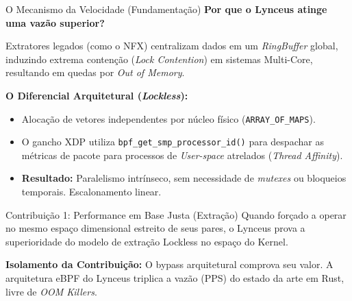 \documentclass[aspectratio=169,11pt]{beamer}
\begin{document}
\begin{frame}{O Mecanismo da Velocidade (Fundamentação)}
    \textbf{Por que o Lynceus atinge uma vazão superior?}
    \vspace{0.3cm}
    
    Extratores legados (como o NFX) centralizam dados em um \textit{RingBuffer} global, induzindo extrema contenção (\textit{Lock Contention}) em sistemas Multi-Core, resultando em quedas por \textit{Out of Memory}.
    
    \vspace{0.3cm}
    \textbf{O Diferencial Arquitetural (\textit{Lockless}):}
    \begin{itemize}
        \item Alocação de vetores independentes por núcleo físico (\texttt{ARRAY\_OF\_MAPS}).
        \item O gancho XDP utiliza \texttt{bpf\_get\_smp\_processor\_id()} para despachar as métricas de pacote para processos de \textit{User-space} atrelados (\textit{Thread Affinity}).
        \item \textbf{Resultado:} Paralelismo intrínseco, sem necessidade de \textit{mutexes} ou bloqueios temporais. Escalonamento linear.
    \end{itemize}
\end{frame}

\begin{frame}{Contribuição 1: Performance em Base Justa (Extração)}
    Quando forçado a operar no mesmo espaço dimensional estreito de seus pares, o Lynceus prova a superioridade do modelo de extração Lockless no espaço do Kernel.
    
    \begin{table}[]
        \centering
    \end{table}
    
    \textbf{Isolamento da Contribuição:} O bypass arquitetural comprova seu valor. A arquitetura eBPF do Lynceus triplica a vazão (PPS) do estado da arte em Rust, livre de \textit{OOM Killers}.
\end{frame}
\end{document}
